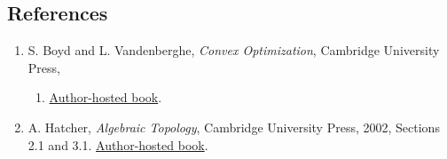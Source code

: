 \documentclass[
]{article}
\providecommand{\tightlist}{%
  \setlength{\itemsep}{0pt}\setlength{\parskip}{0pt}}
\begin{document}
\subsection{References}\label{references}

\begin{enumerate}
\def\labelenumi{\arabic{enumi}.}
\tightlist
\item
  S. Boyd and L. Vandenberghe, \emph{Convex Optimization}, Cambridge
  University Press,

  \begin{enumerate}
  \def\labelenumii{\arabic{enumii}.}
  \setcounter{enumii}{2003}
  \tightlist
  \item
    \href{https://web.stanford.edu/~boyd/cvxbook/}{Author-hosted book}.
  \end{enumerate}
\item
  A. Hatcher, \emph{Algebraic Topology}, Cambridge University Press,
  2002, Sections 2.1 and 3.1.
  \href{https://pi.math.cornell.edu/~hatcher/AT/ATpage.html}{Author-hosted
  book}.
\end{enumerate}
\end{document}
